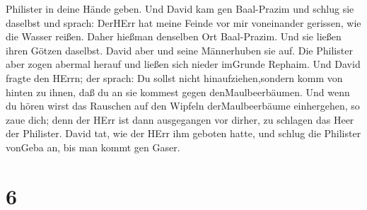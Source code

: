 Philister in deine Hände geben.  Und David kam gen
Baal-Prazim und schlug sie daselbst und sprach: DerHErr hat meine Feinde
vor mir voneinander gerissen, wie die Wasser reißen. Daher hießman
denselben Ort Baal-Prazim.  Und sie ließen ihren Götzen
daselbst. David aber und seine Männerhuben sie auf.  Die
Philister aber zogen abermal herauf und ließen sich nieder imGrunde
Rephaim.  Und David fragte den HErrn; der sprach: Du sollst
nicht hinaufziehen,sondern komm von hinten zu ihnen, daß du an sie
kommest gegen denMaulbeerbäumen.  Und wenn du hören wirst
das Rauschen auf den Wipfeln derMaulbeerbäume einhergehen, so zaue dich;
denn der HErr ist dann ausgegangen vor dirher, zu schlagen das Heer der
Philister.  David tat, wie der HErr ihm geboten hatte, und
schlug die Philister vonGeba an, bis man kommt gen Gaser.

\hypertarget{section-5}{%
\section{6}\label{section-5}}

